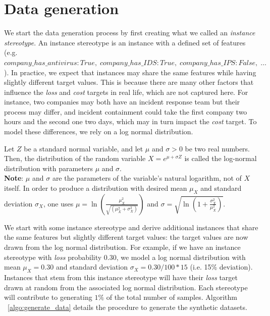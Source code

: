 \section{Data generation}\label{section:generation}

We start the data generation process by first creating what we called an \textit{instance stereotype}. An instance stereotype is an instance with a defined set of features (e.g. $company\_has\_antivirus: True, \; company\_has\_IDS: True, \; company\_has\_IPS: False, \; \dots$).  In practice, we expect that instances may share the same features while having slightly different target values. This is because there are many other factors that influence the \textit{loss} and \textit{cost} targets in real life, which are not captured here. For instance, two companies may both have an incident response team but their process may differ, and incident containment could take  the first company two hours and the second one two days, which may in turn impact the \textit{cost} target.  To model these differences, we rely on a log normal distribution.

\begin{definition}
Let $Z$ be a standard normal variable, and let $\mu$ and $\sigma > 0$ be two real numbers. Then, the distribution of the random variable $X=e^{\mu+\sigma Z}$ is called the log-normal distribution with parameters $\mu$ and $\sigma$. \\

\textbf{Note}: $\mu$ and $\sigma$ are the parameters of the variable's natural logarithm, not of $X$ itself. In order to produce a distribution with desired mean $\mu_X$ and standard deviation $\sigma_X$, one uses $\mu=\ln\left(\frac{\mu_X^2}{\sqrt{\left(\mu_X^2 + \sigma_X^2\right)}}\right)$ and $\sigma = \sqrt{\ln\left(1 + \frac{\sigma_X^2}{\mu_X^2}\right)}$.
\end{definition}

We start with some instance stereotype and derive additional instances that share the same features but slightly different target values: the target values are now drawn from the log normal distribution. For example, if we have an instance stereotype with \textit{loss} probability 0.30, we model a log normal distribution with mean $\mu_X = 0.30$ and standard deviation $\sigma_{X} = 0.30 / 100 * 15$ (i.e. 15\% deviation). Instances that stem from this instance stereotype will have their \textit{loss} target drawn at random from the associated log normal distribution. Each stereotype will contribute to generating $1\%$ of the total number of samples. Algorithm ~\ref{algo:generate_data} details the procedure to generate the synthetic datasets.

